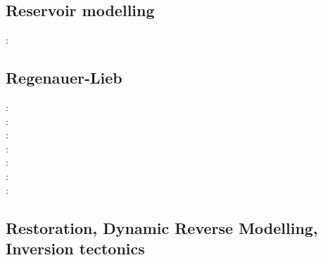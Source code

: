 \subsection{Reservoir modelling}

\begin{scriptsize}
\twothousandthirteen: \textcite{orwa13}
\end{scriptsize}

\subsection{Regenauer-Lieb}

{\scriptsize
\twothousand: \cite{reyu98}\\
\twothousand: \cite{reyu00}\\
\twothousandthree: \cite{reyu03}\\
\twothousandfour: \cite{reyu04}\\
\twothousandsix: \cite{rehy06}\cite{rewr06}\\
\twothousandnine: \cite{reps09}\\
\twothousandthirteen: \cite{revp13}
}

\subsection{Restoration, Dynamic Reverse Modelling, Inversion tectonics}

